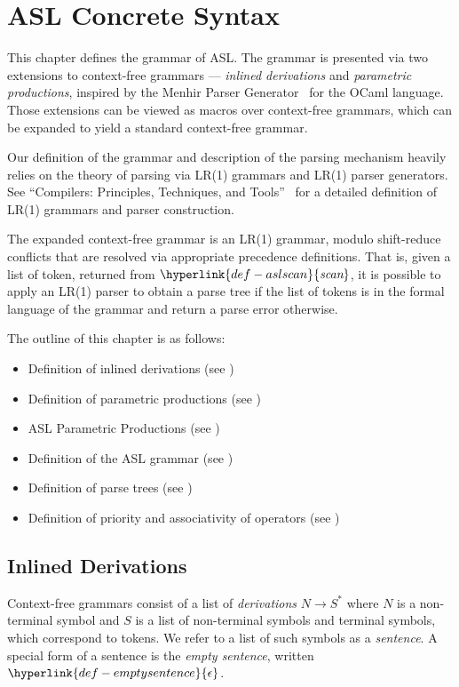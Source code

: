 \documentclass{book}
\newcommand\emptysentence[0]{\hyperlink{def-emptysentence}{\epsilon}}
\newcommand\derives[0]{\longrightarrow}
\newcommand\aslscan[0]{\hyperlink{def-aslscan}{\textfunc{scan}}}
\begin{document}
\chapter{ASL Concrete Syntax \label{chap:parsing}}

This chapter defines the grammar of ASL. The grammar is presented via two extensions
to context-free grammars --- \emph{inlined derivations} and \emph{parametric productions},
inspired by the Menhir Parser Generator~\cite{MenhirManual} for the OCaml language.
Those extensions can be viewed as macros over context-free grammars, which can be
expanded to yield a standard context-free grammar.

Our definition of the grammar and description of the parsing mechanism heavily relies
on the theory of parsing via LR(1) grammars and LR(1) parser generators.
%
See ``Compilers: Principles, Techniques, and Tools''~\cite{ASU86} for a detailed
definition of LR(1) grammars and parser construction.

The expanded context-free grammar is an LR(1) grammar, modulo shift-reduce
conflicts that are resolved via appropriate precedence definitions.
That is, given a list of token, returned from $\aslscan$, it is possible to apply
an LR(1) parser to obtain a parse tree if the list of tokens is in the formal language
of the grammar and return a parse error otherwise.

The outline of this chapter is as follows:
\begin{itemize}
  \item Definition of inlined derivations (see )
  \item Definition of parametric productions (see )
  \item ASL Parametric Productions (see )
  \item Definition of the ASL grammar (see )
  \item Definition of parse trees (see )
  \item Definition of priority and associativity of operators (see )
\end{itemize}

\section{Inlined Derivations \label{sec:InlinedDerivations}}
Context-free grammars consist of a list of \emph{derivations} $N \derives S^*$
where $N$ is a non-terminal symbol and $S$ is a list of non-terminal symbols and terminal symbols,
which correspond to tokens.
We refer to a list of such symbols as a \emph{sentence}.
A special form of a sentence is the \emph{empty sentence}, written $\emptysentence$.
\end{document}
